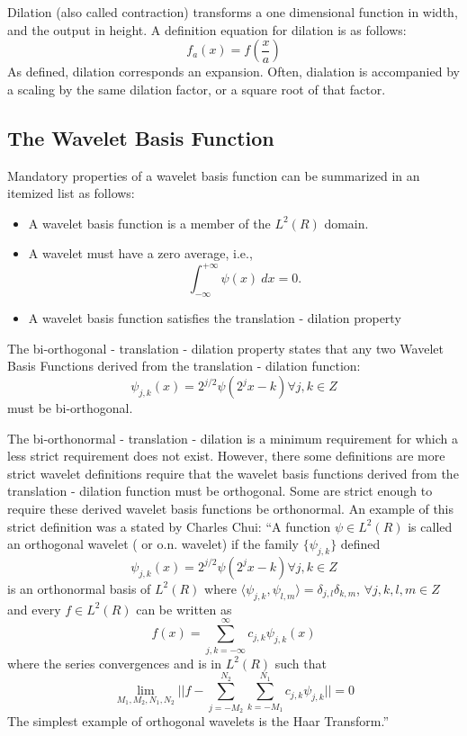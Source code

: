 Dilation (also called contraction) transforms a one dimensional function in width, and the output in height.   A definition equation for dilation is as follows:
\[ f_a (x) =  f(\frac{x}{a}) \]
As defined, dilation corresponds an expansion.  Often, dialation is accompanied by a scaling by the same dilation factor, or a square root of that factor.   

\subsection {The Wavelet Basis Function}
Mandatory properties of a wavelet basis function can be summarized in an itemized list as follows:
\begin{itemize}
\item A wavelet basis function is a member of the $L^2(R)$ domain.  
\item A wavelet must have a zero average, i.e.,
\[
\int_{-\infty}^{+\infty}\psi(x) \ dx = 0.
\]
\item A wavelet basis function satisfies the translation - dilation property
\end{itemize}

The bi-orthogonal - translation - dilation property states that any two Wavelet Basis Functions derived from the translation - dilation function:
\[ \psi_{j,k}(x)  = 2^{j/2} \psi (2 ^j x -k) \forall j,k \in Z \]
must be bi-orthogonal.   

The bi-orthonormal - translation - dilation is a minimum requirement for which a less strict requirement does not exist.  However, there some definitions are more strict wavelet definitions require that the wavelet basis functions derived from the translation - dilation function must be orthogonal.  Some are strict enough to require these derived wavelet basis functions be orthonormal.  An example of this strict definition was a stated by Charles Chui:  
``A function $\psi \in L^2(R)$ is called an orthogonal wavelet ( or o.n. wavelet) if the family $\{\psi_{j,k}\}$ defined 
\[ \psi_{j,k}(x)  = 2^{j/2} \psi (2 ^j x -k) \forall j,k \in Z \]
is an orthonormal basis of $L^2(R)$ where $\langle \psi _{j,k} , \psi_{l,m} \rangle = \delta _{j,l} \delta_{k,m}$,  $ \forall j,k,l,m\in Z$ and every $ f\in L^2(R)$ can be written as 
\[ f(x)= \sum\limits _{j,k = -\infty}^{\infty} c_{j,k} \psi _{j,k} (x)  \]
where the series convergences and is %
in $L^2(R)$ such that 
\[ \lim\limits _{M_1, M_2, N_1 , N_2} || f - \sum\limits _{j=-M_2}^{N_2} \sum\limits _{k=-M_1}^{N_1} c_{j,k} \psi _{j,k} || = 0 \]
The simplest example of orthogonal wavelets is the Haar Transform.''\cite{ChuiIntro} 

